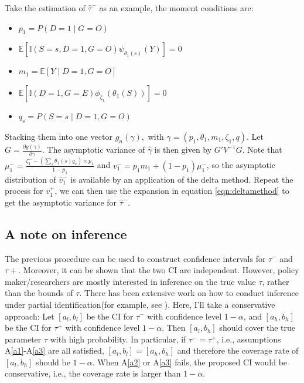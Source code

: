 \documentclass[12pt]{article}
\newcommand{\Indc}{\mathbb{I}}
\begin{document}
    Take the estimation of $\hat{\tau}^-$ as an example, the moment conditions are: 
	\begin{itemize}
	    \item 	$p_1 = P(D = 1 \mid G = O)$
	    
	    \item $\mathbb{E}\left[\mathbb{I}(S=s, D=1, G = O) \psi_{\theta_1(s)}(Y)\right]  = 0$
	    
        \item $m_1 = \mathbb{E}[Y \mid D = 1, G = O]$
        
        \item $\mathbb{E}\left[\Indc(D=1,G=E)\phi_{{\zeta}_1}(\theta_1(S))\right] = 0$
        
        \item $q_s = P(S=s \mid D=1, G=O)$
	\end{itemize}
	Stacking them into one vector $g_n(\gamma), $ with $\gamma = (p_1, \theta_1, m_1, \zeta_1, q)$. Let $G = \frac{\partial g(\gamma)}{\partial \gamma}$. The asymptotic variance of $\hat{\gamma}$ is then given by $G'V^{-1}G$. Note that $\mu_1^- = \frac{\zeta_1^- - (\sum_s \theta_1(s) q_s)  \times p_1}{1 - p_1}$ and $v_1^- = p_1 m_1 + (1 - p_1) \mu_1^- $, so the asymptotic distribution of $\hat{v}_1^-$ is available by an application of the delta method. Repeat the process for $v_1^+$, we can then use the expansion in equation \ref{eqn:deltamethod} to get the asymptotic variance for $\hat{\tau}^-.$
	
	\subsection{A note on inference}
	The previous procedure can be used to construct confidence intervals for $\tau^-$ and $\tau+$. 
    Moreover, it can be shown that the two CI are independent. 
    However, policy maker/researchers are mostly interested in inference on the true value $\tau$, rather than the bounds of $\tau$. 
    There has been extensive work on how to conduct inference under partial identification(for example, see \textcite{Andrews2007InferenceFP, stoye2020simple}). 
    Here, I'll take a conservative approach: Let $[a_l, b_l]$ be the CI for $\tau^-$ with confidence level $1 - \alpha$, and $[a_h, b_h]$ be the CI for $\tau^+$ with confidence level $1 - \alpha$. 
    Then $[a_l, b_h]$ should cover the true parameter $\tau$ with high probability. 
    In particular, if $\tau^- = \tau^+$, i.e., assumptions A\ref{a1}-A\ref{a3} are all satisfied, $[a_l, b_l] = [a_h, b_h]$ and therefore the coverage rate of $[a_l, b_h]$ should be $1 - \alpha$. 
    When A\ref{a2} or A\ref{a3} fails, the proposed CI would be conservative, i.e., the coverage rate is larger than $1 - \alpha$.
	
\end{document}
